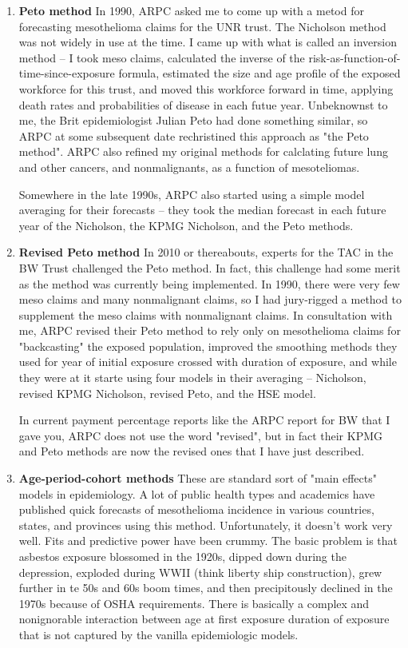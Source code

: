 \documentclass{article}\usepackage{graphicx, color}
\begin{document}
\begin{enumerate}
\item \textbf{Peto method} In 1990, ARPC asked me to come up with a metod for forecasting mesothelioma claims for the UNR trust.  The Nicholson method was not widely in use at the time.  I came up with what is called an inversion method -- I took meso claims, calculated the inverse of the risk-as-function-of-time-since-exposure formula, estimated the size and age profile of the exposed workforce for this trust, and moved this workforce forward in time, applying death rates and probabilities of disease in each futue year.  Unbeknownst to me, the Brit epidemiologist Julian Peto had done something similar, so ARPC at some subsequent date rechristined this approach as "the Peto method".  ARPC also refined my original methods for calclating future lung and other cancers, and nonmalignants, as a function of mesoteliomas.

Somewhere in the late 1990s, ARPC also started using a simple model averaging for their forecasts -- they took the median forecast in each future year of the Nicholson, the KPMG Nicholson, and the Peto methods.

\item \textbf{Revised Peto method}  In 2010 or thereabouts, experts for the TAC in the BW Trust challenged the Peto method.  In fact, this challenge had some merit as the method was currently being implemented.  In 1990, there were very few meso claims and many nonmalignant claims, so I had jury-rigged a method to supplement the meso claims with nonmalignant claims.  In consultation with me, ARPC revised their Peto method to rely only on mesothelioma claims for "backcasting" the exposed population, improved the smoothing methods they used for year of initial exposure crossed with duration of exposure, and while they were at it starte using four models in their averaging -- Nicholson, revised KPMG Nicholson, revised Peto, and the HSE model.

In current payment percentage reports like the ARPC report for BW that I gave you, ARPC does not use the word "revised", but in fact their KPMG and Peto methods are now the revised ones that I have just described.

\item \textbf{Age-period-cohort methods} These are standard sort of "main effects" models in epidemiology.  A lot of public health types and academics have published quick forecasts of mesothelioma incidence in various countries, states, and provinces using this method.  Unfortunately, it doesn't work very well.  Fits and predictive power have been crummy.  The basic problem is that asbestos exposure blossomed in the 1920s, dipped down during the depression, exploded during WWII (think liberty ship construction), grew further in te 50s and 60s boom times, and then precipitously declined in the 1970s because of OSHA requirements.  There is basically a complex and nonignorable interaction between age at first exposure duration of exposure that is not captured by the vanilla epidemiologic models.


\end{enumerate}
\end{document}
